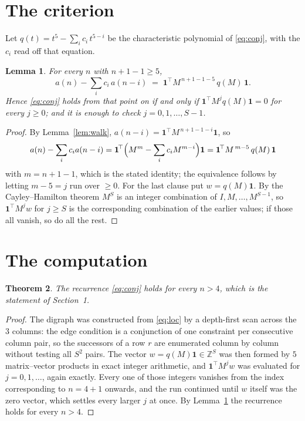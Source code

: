 \documentclass[11pt,a4paper]{article}
\theoremstyle{plain}
\newtheorem{theorem}{Theorem}
\newtheorem{lemma}[theorem]{Lemma}
\theoremstyle{definition}
\begin{document}
\section{The criterion}

Let $q(t)=t^{5}-\sum_i c_i\,t^{5-i}$ be the characteristic polynomial of
\eqref{eq:conj}, with the $c_i$ read off that equation.

\begin{lemma}\label{lem:crit}
For every $n$ with $n+1-1\ge5$,
\[
a(n)-\sum_i c_i\,a(n-i)\;=\;\mathbf{1}^{\!\top}M^{\,n+1-1-5}\,q(M)\,\mathbf{1} .
\]
Hence \eqref{eq:conj} holds from that point on if and only if
$\mathbf{1}^{\!\top}M^{j}q(M)\mathbf{1}=0$ for every $j\ge0$; and it is enough to check
$j=0,1,\dots,S-1$.
\end{lemma}

\begin{proof}
By Lemma~\ref{lem:walk}, $a(n-i)=\mathbf{1}^{\!\top}M^{\,n+1-1-i}\mathbf{1}$, so
\[
a(n)-\sum_i c_i a(n-i)
=\mathbf{1}^{\!\top}\Bigl(M^{m}-\sum_i c_i M^{m-i}\Bigr)\mathbf{1}
=\mathbf{1}^{\!\top}M^{\,m-5}\,q(M)\,\mathbf{1}
\]
with $m=n+1-1$, which is the stated identity; the equivalence follows by letting
$m-5=j$ run over $\ge0$. For the last clause put $w=q(M)\mathbf{1}$. By the
Cayley--Hamilton theorem $M^{S}$ is an integer combination of $I,M,\dots,M^{S-1}$, so
$\mathbf{1}^{\!\top}M^{j}w$ for $j\ge S$ is the corresponding combination of the earlier
values; if those all vanish, so do all the rest.
\end{proof}

\section{The computation}

\begin{theorem}
The recurrence \eqref{eq:conj} holds for every $n>4$, which is the statement of
Section~1.
\end{theorem}

\begin{proof}
The digraph was constructed from \eqref{eq:loc} by a depth-first scan across the $3$
columns: the edge condition is a conjunction of one constraint per consecutive column
pair, so the successors of a row $r$ are enumerated column by column without testing all
$S^2$ pairs. The vector $w=q(M)\mathbf{1}\in\mathbb{Z}^{S}$ was then formed by $5$
matrix--vector products in exact integer arithmetic, and $\mathbf{1}^{\!\top}M^{j}w$ was
evaluated for $j=0,1,\dots$, again exactly. Every one of those integers vanishes from the
index corresponding to $n=4+1$ onwards, and the run continued until $w$ itself was the
zero vector, which settles every larger $j$ at once. By Lemma~\ref{lem:crit} the recurrence
holds for every $n>4$.
\end{proof}
\end{document}

